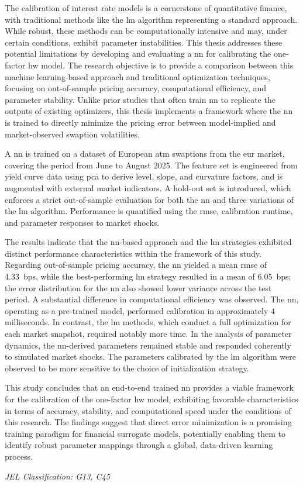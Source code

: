 The calibration of interest rate models is a cornerstone of quantitative finance, with traditional methods like the \ac{lm} algorithm representing a standard approach. While robust, these methods can be computationally intensive and may, under certain conditions, exhibit parameter instabilities. This thesis addresses these potential limitations by developing and evaluating a \ac{nn} for calibrating the one-factor \ac{hw} model. The research objective is to provide a comparison between this machine learning-based approach and traditional optimization techniques, focusing on out-of-sample pricing accuracy, computational efficiency, and parameter stability. Unlike prior studies that often train \ac{nn} to replicate the outputs of existing optimizers, this thesis implements a framework where the \ac{nn} is trained to directly minimize the pricing error between model-implied and market-observed swaption volatilities.

A \ac{nn} is trained on a dataset of European \ac{atm} swaptions from the \ac{eur} market, covering the period from June to August 2025. The feature set is engineered from yield curve data using \ac{pca} to derive level, slope, and curvature factors, and is augmented with external market indicators. A hold-out set is introduced, which enforces a strict out-of-sample evaluation for both the \ac{nn} and three variations of the \ac{lm} algorithm. Performance is quantified using the \ac{rmse}, calibration runtime, and parameter responses to market shocks.

The results indicate that the \ac{nn}-based approach and the \ac{lm} strategies exhibited distinct performance characteristics within the framework of this study. Regarding out-of-sample pricing accuracy, the \ac{nn} yielded a mean \ac{rmse} of 4.33~\ac{bps}, while the best-performing \ac{lm} strategy resulted in a mean of 6.05~\ac{bps}; the error distribution for the \ac{nn} also showed lower variance across the test period. A substantial difference in computational efficiency was observed. The \ac{nn}, operating as a pre-trained model, performed calibration in approximately 4 milliseconds. In contrast, the \ac{lm} methods, which conduct a full optimization for each market snapshot, required notably more time. In the analysis of parameter dynamics, the \ac{nn}-derived parameters remained stable and responded coherently to simulated market shocks. The parameters calibrated by the \ac{lm} algorithm were observed to be more sensitive to the choice of initialization strategy.

This study concludes that an end-to-end trained \ac{nn} provides a viable framework for the calibration of the one-factor \ac{hw} model, exhibiting favorable characteristics in terms of accuracy, stability, and computational speed under the conditions of this research. The findings suggest that direct error minimization is a promising training paradigm for financial surrogate models, potentially enabling them to identify robust parameter mappings through a global, data-driven learning process.

\textit{JEL Classification: G13, C45}
